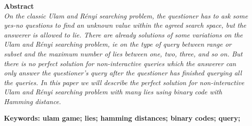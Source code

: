 \noindent\textbf{\large Abstract} \\
\itshape
On the classic Ulam and Rényi searching problem, the questioner has to ask some yes-no questions to find an unknown value within the agreed search space, but the answerer is allowed to lie. There are already solutions of some variations on the Ulam and Rényi searching problem, ie on the type of query between range or subset and the maximum number of lies between one, two, three, and so on. But there is no perfect solution for non-interactive queries which the answerer can only answer the questioner's query after the questioner has finished querying all the queries. In this paper we will describe the perfect solution for non-interactive Ulam and Rényi searching problem with many lies using binary code with Hamming distance.

\vspace*{1em}
\noindent\bfseries Keywords: ulam game; lies; hamming distances; binary codes; query;
\normalfont
\cleardoublepage
